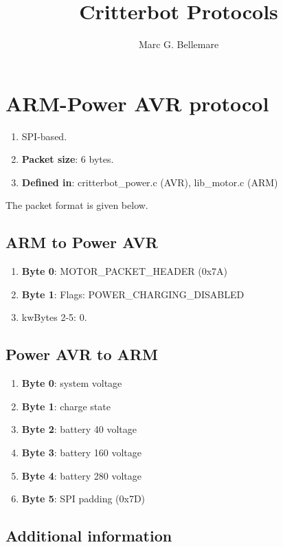 \documentclass[12pt]{article}
\author{Marc G. Bellemare}
\title{Critterbot Protocols}
\newcommand{\kw}[1]{\textbf{#1}}
\begin{document}
\maketitle

\section{ARM-Power AVR protocol}

\begin{enumerate}
  \item{SPI-based.}
  \item{\kw{Packet size}: 6 bytes.}
  \item{\kw{Defined in}: critterbot\_power.c (AVR), lib\_motor.c (ARM)}
\end{enumerate}

The packet format is given below.

\subsection{ARM to Power AVR}

\begin{enumerate}
  \item{\kw{Byte 0}: MOTOR\_PACKET\_HEADER (0x7A)}
  \item{\kw{Byte 1}: Flags: POWER\_CHARGING\_DISABLED} 
  \item{kw{Bytes 2-5}: 0.}
\end{enumerate}

\subsection{Power AVR to ARM}

\begin{enumerate}
  \item{\kw{Byte 0}: system voltage}
  \item{\kw{Byte 1}: charge state}
  \item{\kw{Byte 2}: battery 40 voltage}
  \item{\kw{Byte 3}: battery 160 voltage}
  \item{\kw{Byte 4}: battery 280 voltage}
  \item{\kw{Byte 5}: SPI padding (0x7D)}
\end{enumerate}

\subsection{Additional information}
\end{document}
